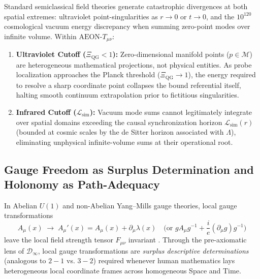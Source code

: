\documentclass[11pt,a4paper]{article}
\begin{document}
Standard semiclassical field theories generate catastrophic divergences at both spatial extremes: ultraviolet point-singularities as $r \to 0$ or $t \to 0$, and the $10^{120}$ cosmological vacuum energy discrepancy when summing zero-point modes over infinite volume. Within $\text{AEON-}T_{\mu\nu}$:
\begin{enumerate}[label=\textbf{(\arabic*)}]
    \item \textbf{Ultraviolet Cutoff ($\Xi_{\mathrm{QG}} < 1$):} Zero-dimensional manifold points ($p \in \mathcal{M}$) are heterogeneous mathematical projections, not physical entities. As probe localization approaches the Planck threshold ($\Xi_{\mathrm{QG}} \to 1$), the energy required to resolve a sharp coordinate point collapses the bound referential itself, halting smooth continuum extrapolation prior to fictitious singularities.
    \item \textbf{Infrared Cutoff ($\mathcal{L}_{\mathrm{sim}}$):} Vacuum mode sums cannot legitimately integrate over spatial domains exceeding the causal synchronization horizon $\mathcal{L}_{\mathrm{sim}}(r)$ (bounded at cosmic scales by the de Sitter horizon associated with $\Lambda$), eliminating unphysical infinite-volume sums at their operational root.
\end{enumerate}

\subsection{Gauge Freedom as Surplus Determination and Holonomy as Path-Adequacy}

In Abelian $U(1)$ and non-Abelian Yang--Mills gauge theories, local gauge transformations
\begin{equation}
A_\mu(x) \;\longrightarrow\; A_\mu'(x) = A_\mu(x) + \partial_\mu \lambda(x) \quad \text{(or } g A_\mu g^{-1} + \frac{i}{e}(\partial_\mu g)g^{-1}\text{)}
\end{equation}
leave the local field strength tensor $F_{\mu\nu}$ invariant \cite{Healey2007}. Through the pre-axiomatic lens of $\mathcal{D}_\infty$, local gauge transformations are \emph{surplus descriptive determinations} (analogous to $2 - 1$ vs. $3 - 2$) required whenever human mathematics lays heterogeneous local coordinate frames across homogeneous Space and Time.
\end{document}
